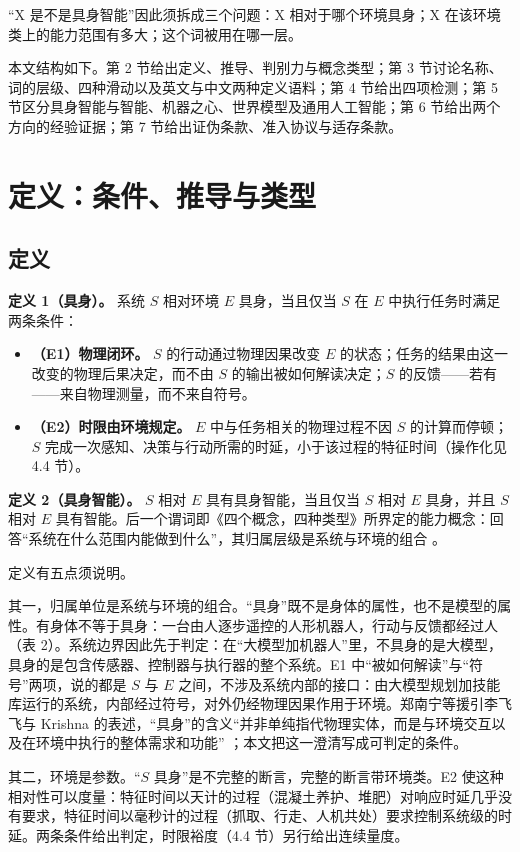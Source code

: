 \documentclass[10pt,fontset=fandol]{ctexart}
\begin{document}
“X 是不是具身智能”因此须拆成三个问题：X 相对于哪个环境具身；X 在该环境类上的能力范围有多大；这个词被用在哪一层。

本文结构如下。第 2 节给出定义、推导、判别力与概念类型；第 3 节讨论名称、词的层级、四种滑动以及英文与中文两种定义语料；第 4 节给出四项检测；第 5 节区分具身智能与智能、机器之心、世界模型及通用人工智能；第 6 节给出两个方向的经验证据；第 7 节给出证伪条款、准入协议与适存条款。

\section{定义：条件、推导与类型}\label{sec:s2}

\subsection{定义}

\textbf{定义 1（具身）。} 系统 $S$ 相对环境 $E$ 具身，当且仅当 $S$ 在 $E$ 中执行任务时满足两条条件：

\begin{itemize}
\item \textbf{（E1）物理闭环。} $S$ 的行动通过物理因果改变 $E$ 的状态；任务的结果由这一改变的物理后果决定，而不由 $S$ 的输出被如何解读决定；$S$ 的反馈——若有——来自物理测量，而不来自符号。
\item \textbf{（E2）时限由环境规定。} $E$ 中与任务相关的物理过程不因 $S$ 的计算而停顿；$S$ 完成一次感知、决策与行动所需的时延，小于该过程的特征时间（操作化见 4.4 节）。
\end{itemize}
\textbf{定义 2（具身智能）。} $S$ 相对 $E$ 具有具身智能，当且仅当 $S$ 相对 $E$ 具身，并且 $S$ 相对 $E$ 具有智能。后一个谓词即《四个概念，四种类型》所界定的能力概念：回答“系统在什么范围内能做到什么”，其归属层级是系统与环境的组合 \cite{yu2026four}。

定义有五点须说明。

其一，归属单位是系统与环境的组合。“具身”既不是身体的属性，也不是模型的属性。有身体不等于具身：一台由人逐步遥控的人形机器人，行动与反馈都经过人（表 2）。系统边界因此先于判定：在“大模型加机器人”里，不具身的是大模型，具身的是包含传感器、控制器与执行器的整个系统。E1 中“被如何解读”与“符号”两项，说的都是 $S$ 与 $E$ 之间，不涉及系统内部的接口：由大模型规划加技能库运行的系统，内部经过符号，对外仍经物理因果作用于环境。郑南宁等援引李飞飞与 Krishna 的表述，“具身”的含义“并非单纯指代物理实体，而是与环境交互以及在环境中执行的整体需求和功能” \cite{zheng2026}；本文把这一澄清写成可判定的条件。

其二，环境是参数。“$S$ 具身”是不完整的断言，完整的断言带环境类。E2 使这种相对性可以度量：特征时间以天计的过程（混凝土养护、堆肥）对响应时延几乎没有要求，特征时间以毫秒计的过程（抓取、行走、人机共处）要求控制系统级的时延。两条条件给出判定，时限裕度（4.4 节）另行给出连续量度。
\end{document}
